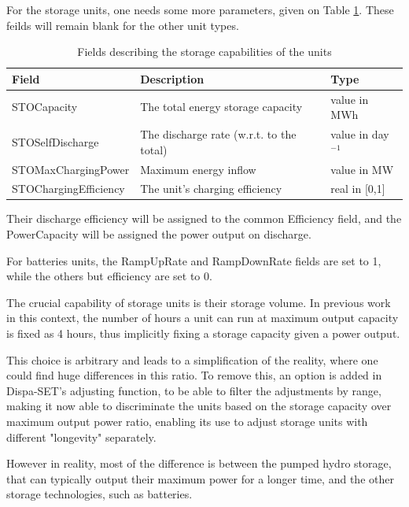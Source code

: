 For the storage units, one needs some more parameters, given on Table \ref{table:plant-storage-db}. These feilds will remain blank for the other unit types.

\begin{table}[h]
    \centering
    \begin{tabular}{|l l l|}
        \hline
        Field                 & Description                       & Type          \\ \hline
        STOCapacity           & The total energy storage capacity & value in MWh  \\
        STOSelfDischarge      & The discharge rate (w.r.t. to the total) & value in day$^{-1}$ \\
        STOMaxChargingPower   & Maximum energy inflow             & value in MW   \\
        STOChargingEfficiency & The unit's charging efficiency    & real in [0,1] \\ \hline
    \end{tabular}
    \caption{Fields describing the storage capabilities of the units}
    \label{table:plant-storage-db}
\end{table}


Their discharge efficiency will be assigned to the common Efficiency field, and the PowerCapacity will be assigned the power output on discharge.

For batteries units, the RampUpRate and RampDownRate fields are set to 1, while the others but efficiency are set to 0. 

The crucial capability of storage units is their storage volume. In previous work in this context, the number of hours a unit can run at maximum output capacity is fixed as 4 hours, thus implicitly fixing a storage capacity given a power output.

This choice is arbitrary and leads to a simplification of the reality, where one could find huge differences in this ratio. To remove this, an option is added in Dispa-SET's adjusting function, to be able to filter the adjustments by range, making it now able to discriminate the units based on the storage capacity over maximum output power ratio, enabling its use to adjust storage units with different "longevity" separately.

However in reality, most of the difference is between the pumped hydro storage, that can typically output their maximum power for a longer time, and the other storage technologies, such as batteries.

